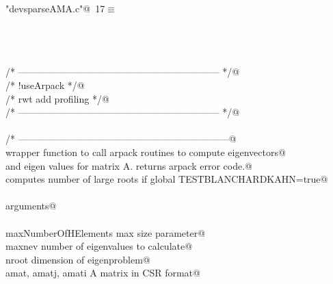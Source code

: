 \documentclass[12pt]{article}
\begin{document}
\begin{flushleft}
\begin{minipage}{\linewidth}
\begin{list}{}{\setlength{\itemsep}{-\parsep}\setlength{\itemindent}{-\leftmargin}}
\item{}
\end{list}
\end{minipage}\vspace{4ex}
\end{flushleft}
\begin{flushleft} \small
\begin{minipage}{\linewidth}\label{scrap4}\raggedright\small
{} \verb@"devsparseAMA.c"@\nobreak\ {\footnotesize {17}}$\equiv$
\vspace{-1ex}
\begin{list}{}{} \item
\mbox{}\verb@@\\
\mbox{}\verb@@\\
\mbox{}\verb@@\\
\mbox{}\verb@/* --------------------------------------------------------------- */@\\
\mbox{}\verb@/* !useArpack                                                      */@\\
\mbox{}\verb@/* rwt add profiling                                               */@\\
\mbox{}\verb@/* --------------------------------------------------------------- */@\\
\mbox{}\verb@@\\
\mbox{}\verb@/* ------------------------------------------------------------------@\\
\mbox{}\verb@        wrapper function to call arpack routines to compute eigenvectors@\\
\mbox{}\verb@        and eigen values for matrix A.  returns arpack error code.@\\
\mbox{}\verb@        computes number of large roots if global TESTBLANCHARDKAHN=true@\\
\mbox{}\verb@@\\
\mbox{}\verb@        arguments@\\
\mbox{}\verb@@\\
\mbox{}\verb@                maxNumberOfHElements                            max size parameter@\\
\mbox{}\verb@                maxnev                                                          number of eigenvalues to calculate@\\
\mbox{}\verb@                nroot                                                           dimension of eigenproblem@\\
\mbox{}\verb@                amat, amatj, amati                                      A matrix in CSR format@\\

\end{list}
\end{minipage}
\end{flushleft}
\end{document}
